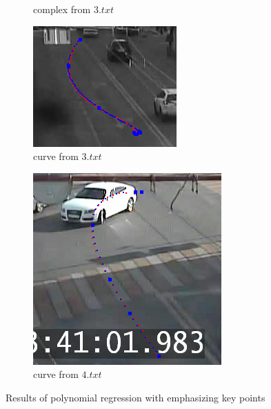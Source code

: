 \begin{figure}[!htb]
\begin{subfigure}[!htb]{0.3\textwidth}
		\caption{complex from $3.txt$}
	\end{subfigure}
	\hfill
	\begin{subfigure}[!htb]{0.3\textwidth}
		\centering{}
		\includegraphics[width=\textwidth]{images/regr_kp_curve_3.png}
		\caption{curve from $3.txt$}
	\end{subfigure}
	\hfill
	\begin{subfigure}[!htb]{0.3\textwidth}
		\centering{}
		\includegraphics[width=\textwidth]{images/regr_kp_curve_4.png}
		\caption{curve from $4.txt$}
	\end{subfigure}

	\caption{Results of polynomial regression with emphasizing key points}
	\label{fig:regr-kp}
\end{figure}

